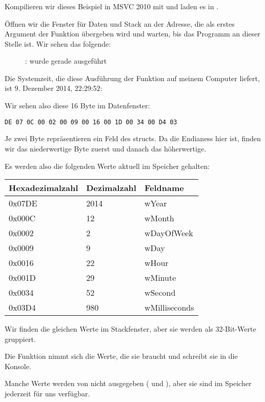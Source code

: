 \clearpage
\subsubsection{\olly}
\myindex{\olly}
Kompilieren wir dieses Beispiel in MSVC 2010 mit  und laden es in \olly.

Öffnen wir die Fenster für Daten und Stack an der Adresse, die als erstes Argument der Funktion 
übergeben wird und warten, bis das Programm an dieser Stelle ist. Wir sehen das folgende:

\begin{figure}[H]
\centering
{}
\caption{\olly:  wurde gerade ausgeführt}
\label{fig:struct_olly_1}
\end{figure}
Die Systemzeit, die diese Ausführung der Funktion auf meinem Computer liefert, ist 9. Dezember 2014, 22:29:52:


Wir sehen also diese 16 Byte im Datenfenster:
 
\begin{lstlisting}
DE 07 0C 00 02 00 09 00 16 00 1D 00 34 00 D4 03
\end{lstlisting}
Je zwei Byte repräsentieren ein Feld des structs. 
Da die \gls{Endianess} hier  ist, finden wir das niederwertige Byte zuerst und danach das
höherwertige.

Es werden also die folgenden Werte aktuell im Speicher gehalten:

\begin{center}
\begin{tabular}{ | l | l | l | }
\hline
\headercolor{} Hexadezimalzahl & 
\headercolor{} Dezimalzahl & 
\headercolor{} Feldname \\
\hline
0x07DE & 2014	& wYear \\
\hline
0x000C & 12	& wMonth \\
\hline
0x0002 & 2	& wDayOfWeek \\
\hline
0x0009 & 9	& wDay \\
\hline
0x0016 & 22	& wHour \\
\hline
0x001D & 29	& wMinute \\
\hline
0x0034 & 52	& wSecond \\
\hline	
0x03D4 & 980	& wMilliseconds \\
\hline
\end{tabular}
\end{center}
Wir finden die gleichen Werte im Stackfenster, aber sie werden als 32-Bit-Werte gruppiert.

Die Funktion \printf nimmt sich die Werte, die sie braucht und schreibt sie in die Konsole.

Manche Werte werden von \printf nicht ausgegeben ( und ), aber sie sind im Speicher
jederzeit für uns verfügbar.
